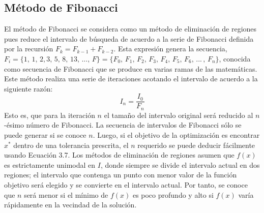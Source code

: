 \subsection{Método de Fibonacci }
El método de Fibonacci se considera como un método de eliminación de regiones pues reduce el intervalo de búsqueda de acuerdo a la serie de Fibonacci definida por la recursión $F_k = F_{k-1} + F_{k-2}$.  Esta expresión genera la secuencia, $F_i= \{1,\, 1,\, 2, 3,\, 5,\, 8,\, 13,\, ...,\,F\} = \{F_0,\, F_1,\, F_2,\, F_3,\, F_4,\, F_5,\, F_6,\, ...\,,\,F_n \}$, conocida como secuencia de Fibonacci que se produce en varias ramas de las matemáticas. Este método realiza una serie de iteraciones acotando el intervalo de acuerdo a la siguiente razón:
\begin{equation}
 I_n = \frac{I_0}{ F_n}
 \end{equation}
Esto es, que para la iteración $n$ el tamaño del intervalo original será reducido al $n$-ésimo número de Fibonacci. La secuencia de intervalos de Fibonacci sólo se puede generar si se conoce $n$. Luego, si el objetivo de la optimización es encontrar $x^*$ dentro de una tolerancia prescrita, el $n$ requerido se puede deducir fácilmente usando Ecuación 3.7. Los métodos de eliminación de regiones asumen que $f(x)$ es estrictamente unimodal en $I$, donde siempre se divide el intervalo actual en dos regiones; el intervalo que contenga un punto con menor valor de la función objetivo será elegido y se convierte en el intervalo actual. Por tanto, se conoce que $n$ será menor si el mínimo de $f(x)$ es poco profundo y alto si $f(x)$ varía rápidamente en la vecindad de la solución. 
